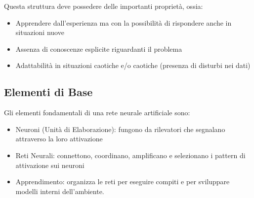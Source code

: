 \documentclass[12pt, a4paper]{article}
\begin{document}
Questa struttura deve possedere delle importanti proprietà, ossia:
\begin{itemize}
    \item Apprendere dall'esperienza ma con la possibilità di rispondere anche in situazioni nuove
    \item Assenza di conoscenze esplicite riguardanti il problema
    \item Adattabilità in situazioni caotiche e/o caotiche (presenza di disturbi nei dati)
\end{itemize}

\subsection{Elementi di Base}
Gli elementi fondamentali di una rete neurale artificiale sono:
\begin{itemize}
    \item Neuroni (Unità di Elaborazione): fungono da rilevatori che segnalano attraverso la loro attivazione
    \item Reti Neurali: connettono, coordinano, amplificano e selezionano i pattern di attivazione sui neuroni
    \item Apprendimento: organizza le reti per eseguire compiti e per sviluppare modelli interni dell'ambiente.
\end{itemize}
\end{document}
